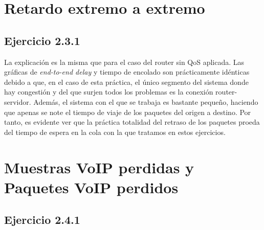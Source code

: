 \section{Retardo extremo a extremo}

\subsection{Ejercicio 2.3.1}
La explicación es la misma que para el caso del router sin QoS aplicada. Las gráficas de \textit{end-to-end delay}
y tiempo de encolado son prácticamente idénticas debido a que, en el caso de esta práctica, el único segmento del 
sistema donde hay congestión y del que surjen todos los problemas es la conexión router-servidor. Además, el sistema
con el que se trabaja es bastante pequeño, haciendo que apenas se note el tiempo de viaje de los paquetes del origen 
a destino. Por tanto, es evidente ver que la práctica totalidad del retraso de los paquetes proeda del tiempo de 
espera en la cola con la que tratamos en estos ejercicios.

\vspace{1cm}

\section{Muestras VoIP perdidas y Paquetes VoIP perdidos}

\subsection{Ejercicio 2.4.1}